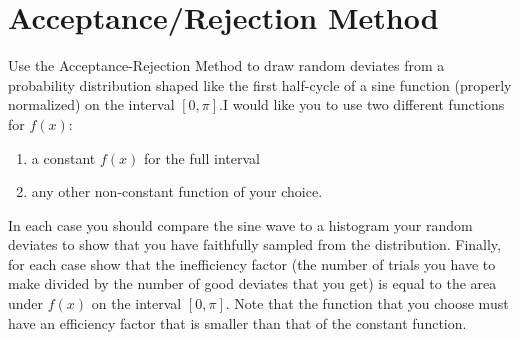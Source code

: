 \section{Acceptance/Rejection Method}

Use the Acceptance-Rejection Method to
draw random deviates from a probability distribution shaped like the first half-cycle of a sine
function (properly normalized) on the interval $[0,\pi]$.I would like you to use two different
functions for $f(x)$:
\begin{enumerate}
    \item a constant $f(x)$ for the full interval
    \item any other non-constant function of your choice.
\end{enumerate}

In each case you should compare the sine wave to a histogram your random deviates to show
that you have faithfully sampled from the distribution. Finally, for each case show that the
inefficiency factor (the number of trials you have to make divided by the number of good deviates
that you get) is equal to the area under $f(x)$ on the interval $[0,\pi]$. Note that the function that
you choose must have an efficiency factor that is smaller than that of the constant function.